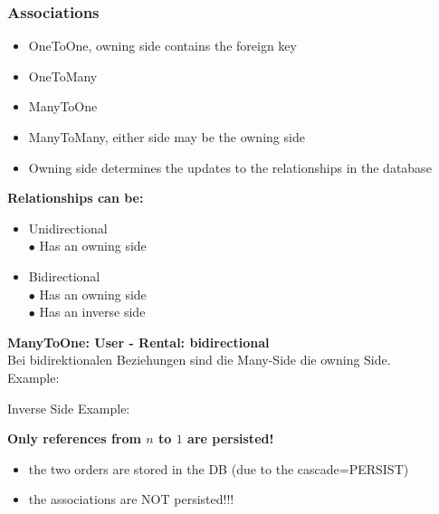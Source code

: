 \documentclass[10pt]{scrartcl}
\newcommand{\Bold}[1]{\textbf{#1}} %
\begin{document}
\subsubsection{Associations}
\begin{itemize}
\item OneToOne, owning side contains the foreign key
\item OneToMany
\item ManyToOne
\item ManyToMany, either side may be the owning side
\item Owning side determines the updates to the relationships in the database
\end{itemize}
\Bold{Relationships can be:}
\begin{itemize}
\item Unidirectional\\
$\bullet$ Has an owning side
\item Bidirectional\\
$\bullet$ Has an owning side\\
$\bullet$ Has an inverse side
\end{itemize}
\Bold{ManyToOne: User - Rental: bidirectional}\\
Bei bidirektionalen Beziehungen sind die Many-Side die owning Side. \\
Example:

Inverse Side Example:

\Bold{Only references from $n$ to $1$ are persisted!}

\begin{itemize}
\item the two orders are stored in the DB (due to the cascade=PERSIST)
\item the associations are NOT persisted!!!
\end{itemize}
\end{document}
